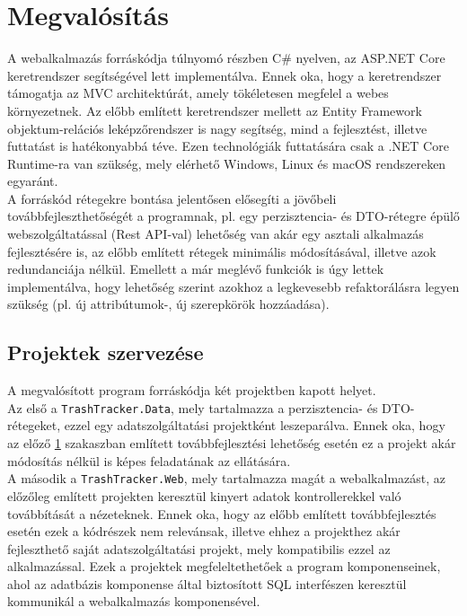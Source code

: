 \section{Megvalósítás}
\label{sec:implementation}

A webalkalmazás forráskódja túlnyomó részben C\# nyelven, az ASP.NET Core keretrendszer segítségével lett implementálva. Ennek oka, hogy a keretrendszer támogatja az MVC architektúrát, amely tökéletesen megfelel a webes környezetnek. Az előbb említett keretrendszer mellett az Entity Framework objektum-relációs leképzőrendszer is nagy segítség, mind a fejlesztést, illetve futtatást is hatékonyabbá téve. Ezen technológiák futtatására csak a .NET Core Runtime-ra van szükség, mely elérhető Windows, Linux és macOS rendszereken egyaránt.\\
A forráskód rétegekre bontása jelentősen elősegíti a jövőbeli továbbfejleszthetőségét a programnak, pl. egy perzisztencia- és DTO-rétegre épülő webszolgáltatással (Rest API-val) lehetőség van akár egy asztali alkalmazás fejlesztésére is, az előbb említett rétegek minimális módosításával, illetve azok redundanciája nélkül. Emellett a már meglévő funkciók is úgy lettek implementálva, hogy lehetőség szerint azokhoz a legkevesebb refaktorálásra legyen szükség (pl. új attribútumok-, új szerepkörök hozzáadása).

\subsection{Projektek szervezése}
\label{subsec:component}

A megvalósított program forráskódja két projektben kapott helyet.\\
Az első a \texttt{TrashTracker.Data}, mely tartalmazza a perzisztencia- és DTO-rétegeket, ezzel egy adatszolgáltatási projektként leszeparálva. Ennek oka, hogy az előző \ref{sec:implementation} szakaszban említett továbbfejlesztési lehetőség esetén ez a projekt akár módosítás nélkül is képes feladatának az ellátására.\\
A második a \texttt{TrashTracker.Web}, mely tartalmazza magát a webalkalmazást, az előzőleg említett projekten keresztül kinyert adatok kontrollerekkel való továbbítását a nézeteknek. Ennek oka, hogy az előbb említett továbbfejlesztés esetén ezek a kódrészek nem relevánsak, illetve ehhez a projekthez akár fejleszthető saját adatszolgáltatási projekt, mely kompatibilis ezzel az alkalmazással.
Ezek a projektek megfeleltethetőek a program komponenseinek, ahol az adatbázis komponense által biztosított SQL interfészen keresztül kommunikál a webalkalmazás komponensével.

